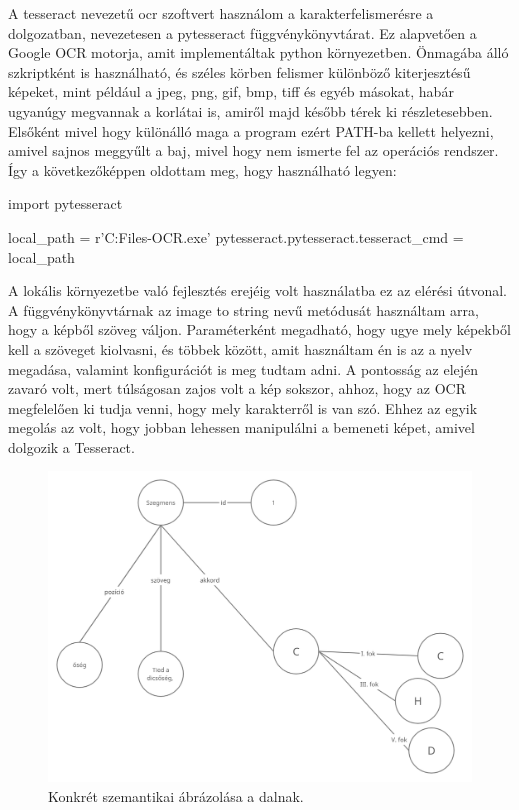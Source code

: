 A tesseract nevezetű ocr szoftvert használom a karakterfelismerésre a dolgozatban, nevezetesen a pytesseract függvénykönyvtárat. Ez alapvetően a Google OCR motorja, amit implementáltak python környezetben. Önmagába álló szkriptként is használható, és széles körben felismer különböző kiterjesztésű képeket, mint például a jpeg, png, gif, bmp, tiff és egyéb másokat, habár ugyanúgy megvannak a korlátai is, amiről majd később térek ki részletesebben. Elsőként mivel hogy különálló maga a program ezért PATH-ba kellett helyezni, amivel sajnos meggyűlt a baj, mivel hogy nem ismerte fel az operációs rendszer. Így a következőképpen oldottam meg, hogy használható legyen:
\begin{python}
import pytesseract
	
local_path =  r'C:\Program Files\Tesseract-OCR\tesseract.exe'
pytesseract.pytesseract.tesseract_cmd = local_path
\end{python}
A lokális környezetbe való fejlesztés erejéig volt használatba ez az elérési útvonal. A függvénykönyvtárnak az image to string nevű metódusát használtam arra, hogy a képből szöveg váljon. Paraméterként megadható, hogy ugye mely képekből kell a szöveget kiolvasni, és többek között, amit használtam én is az a nyelv megadása, valamint konfigurációt is meg tudtam adni. A pontosság az elején zavaró volt, mert túlságosan zajos volt a kép sokszor, ahhoz, hogy az OCR megfelelően ki tudja venni, hogy mely karakterről is van szó. Ehhez az egyik megolás az volt, hogy jobban lehessen manipulálni a bemeneti képet, amivel dolgozik a Tesseract.
\newpage
{}

\begin{figure}[h]
	\includegraphics[scale=0.2]{images/rdf_graph_2.png}
	\caption{Konkrét szemantikai ábrázolása a dalnak.}
	\label{fig:graph2}
\end{figure}

